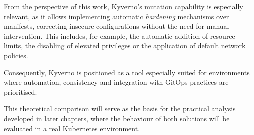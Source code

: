 From the perspective of this work, Kyverno's mutation capability is especially relevant, as it allows implementing automatic \textit{hardening} mechanisms over manifests, correcting insecure configurations without the need for manual intervention. This includes, for example, the automatic addition of resource limits, the disabling of elevated privileges or the application of default network policies.

Consequently, Kyverno is positioned as a tool especially suited for environments where automation, consistency and integration with GitOps practices are prioritised.

This theoretical comparison will serve as the basis for the practical analysis developed in later chapters, where the behaviour of both solutions will be evaluated in a real Kubernetes environment.
